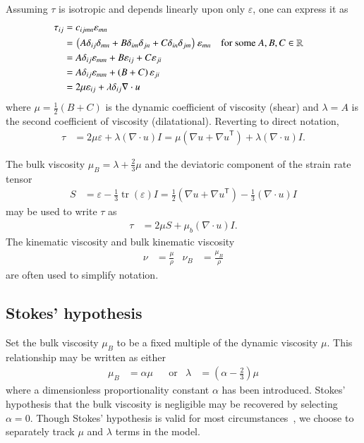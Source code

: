 \documentclass[letterpaper,11pt,nointlimits,reqno,draft]{amsbook}
\newcommand{\trans}[1]{{#1}^{\ensuremath{\mathsf{T}}}}
\DeclareMathOperator{\trace}{tr}
\begin{document}
Assuming $\tau$ is isotropic and depends linearly upon only $\varepsilon$,
one can express it as
\begin{align}
\tau_{ij}
&= c_{ijmn} \varepsilon_{mn}
\notag \\
&= \left( A \delta_{ij} \delta_{mn}
        + B \delta_{im} \delta_{jn}
        + C \delta_{in} \delta_{jm}
    \right) \varepsilon_{mn}
&
&\text{for some }A, B, C\in\mathbb{R}
\notag \\
&= A \delta_{ij} \varepsilon_{mm} + B\varepsilon_{ij} + C\varepsilon_{ji}
\notag \\
&= A \delta_{ij} \varepsilon_{mm} + \left( B+C \right)\varepsilon_{ji}
\notag \\
&= 2 \mu \varepsilon_{ij} + \lambda\delta_{ij}\nabla\cdot{}u
\end{align}
where $\mu=\frac{1}{2}\left( B + C \right)$ is the dynamic coefficient of
viscosity (shear) and $\lambda=A$ is the second coefficient of viscosity
(dilatational).  Reverting to direct notation,
\begin{align}
\tau
&= 2 \mu \varepsilon + \lambda \left( \nabla\cdot{}u \right) I
\label{eq:taunewt}
 =   \mu \left( \nabla{}u + \trans{\nabla{}u} \right)
   + \lambda \left( \nabla\cdot{}u \right) I
.
\end{align}

The bulk viscosity $\mu_{B}=\lambda + \frac{2}{3}\mu$ and the deviatoric
component of the strain rate tensor
\begin{align}
  S &= \varepsilon - \frac{1}{3} \trace\left(\varepsilon\right) I
     = \frac{1}{2}\left(\nabla{}u + \trans{\nabla{}u}\right)
     - \frac{1}{3}\left(\nabla\cdot{}u\right)I
\end{align}
may be used to write $\tau$ as
\begin{align}
\label{eq:tauSmub}
  \tau &= 2 \mu S + \mu_b  \left( \nabla\cdot{}u \right) I
.
\end{align}
The kinematic viscosity and bulk kinematic viscosity
\begin{align}
 \nu &= \frac{\mu}{\rho} & \nu_{B} &= \frac{\mu_{B}}{\rho}
\end{align}
are often used to simplify notation.

\subsection{Stokes' hypothesis}
\label{sec:stokeshypothesis}

Set the bulk viscosity $\mu_{B}$ to be a fixed multiple of the dynamic
viscosity $\mu$.  This relationship may be written as either
\begin{align}
\label{eq:secondviscosityclaw}
\mu_{B} &= \alpha \mu
&
&\text{or}
&
\lambda &= \left( \alpha - \frac{2}{3} \right) \mu
\end{align}
where a dimensionless proportionality constant $\alpha$ has been introduced.
Stokes' hypothesis that the bulk viscosity is negligible may be recovered by
selecting $\alpha = 0$.  Though Stokes' hypothesis is valid for most
circumstances~\citep{GadelHak1995}, we choose to separately track $\mu$ and
$\lambda$ terms in the model.
\end{document}
